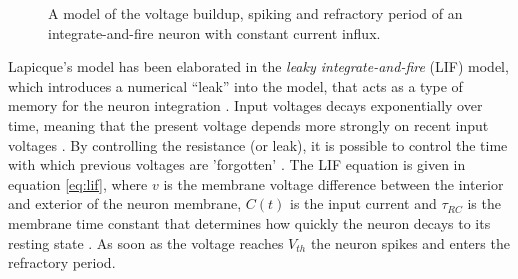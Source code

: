 \documentclass[report.tex]{subfiles}
\begin{document}
\begin{figure}
\centering

\caption{A model of the voltage buildup, spiking and refractory period
         of an integrate-and-fire  
         neuron with constant current influx.}
\label{fig:spiking}
\end{figure}

Lapicque's model has been elaborated in the \textit{leaky
integrate-and-fire} (LIF) 
model, which introduces a numerical ``leak''
into the model, that acts as a type of memory 
for the neuron integration \cite{Eliasmith2004, Eliasmith2015}.
Input voltages decays exponentially over time, meaning that the
present voltage depends more strongly on recent input voltages
\cite[p. 86]{Eliasmith2004}.
By controlling the resistance (or leak), it is possible to
control the time with which previous voltages are 'forgotten'
\cite{Eliasmith2004}.
The LIF equation is given in equation \ref{eq:lif}, where
$v$ is the membrane voltage difference between the interior
and exterior of the neuron membrane, $C(t)$ is the input current
and $\tau_{RC}$ is the membrane time constant that determines how
quickly the neuron decays to its resting state \cite{Dayan2001, Eliasmith2004}.
As soon as the voltage reaches $V_{th}$ the neuron spikes and
enters the refractory period.
\end{document}

